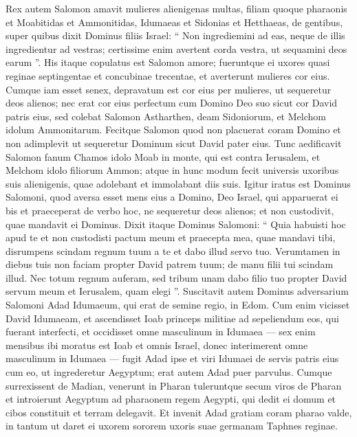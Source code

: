 \begin{biblechapter}
\begin{biblechapter}
\begin{biblechapter}
\begin{biblechapter}
\begin{biblechapter}
\begin{biblechapter}
\begin{biblechapter}
\begin{biblechapter}
\begin{biblechapter}
\begin{biblechapter}
\begin{biblechapter}
\verse Rex autem Salomon amavit mulieres alienigenas multas, filiam quoque pharaonis et Moabitidas et Ammonitidas, Idumaeas et Sidonias et Hetthaeas, 
\verse de gentibus, super quibus dixit Dominus filiis Israel: “ Non ingrediemini ad eas, neque de illis ingredientur ad vestras; certissime enim avertent corda vestra, ut sequamini deos earum ”. His itaque copulatus est Salomon amore; 
\verse fueruntque ei uxores quasi reginae septingentae et concubinae trecentae, et averterunt mulieres cor eius. 
\verse Cumque iam esset senex, depravatum est cor eius per mulieres, ut sequeretur deos alienos; nec erat cor eius perfectum cum Domino Deo suo sicut cor David patris eius, 
\verse sed colebat Salomon Astharthen, deam Sidoniorum, et Melchom idolum Ammonitarum. 
\verse Fecitque Salomon quod non placuerat coram Domino et non adimplevit ut sequeretur Dominum sicut David pater eius. 
\verse Tunc aedificavit Salomon fanum Chamos idolo Moab in monte, qui est contra Ierusalem, et Melchom idolo filiorum Ammon; 
\verse atque in hunc modum fecit universis uxoribus suis alienigenis, quae adolebant et immolabant diis suis.
 \verse Igitur iratus est Dominus Salomoni, quod aversa esset mens eius a Domino, Deo Israel, qui apparuerat ei bis 
\verse et praeceperat de verbo hoc, ne sequeretur deos alienos; et non custodivit, quae mandavit ei Dominus. 
\verse Dixit itaque Dominus Salomoni: “ Quia habuisti hoc apud te et non custodisti pactum meum et praecepta mea, quae mandavi tibi, disrumpens scindam regnum tuum a te et dabo illud servo tuo. 
\verse Verumtamen in diebus tuis non faciam propter David patrem tuum; de manu filii tui scindam illud. 
\verse Nec totum regnum auferam, sed tribum unam dabo filio tuo propter David servum meum et Ierusalem, quam elegi ”.
 \verse Suscitavit autem Dominus adversarium Salomoni Adad Idumaeum, qui erat de semine regio, in Edom. 
\verse Cum enim vicisset David Idumaeam, et ascendisset Ioab princeps militiae ad sepeliendum eos, qui fuerant interfecti, et occidisset omne masculinum in Idumaea 
\verse — sex enim mensibus ibi moratus est Ioab et omnis Israel, donec interimerent omne masculinum in Idumaea — 
\verse fugit Adad ipse et viri Idumaei de servis patris eius cum eo, ut ingrederetur Aegyptum; erat autem Adad puer parvulus. 
\verse Cumque surrexissent de Madian, venerunt in Pharan tuleruntque secum viros de Pharan et introierunt Aegyptum ad pharaonem regem Aegypti, qui dedit ei domum et cibos constituit et terram delegavit. 
 \verse Et invenit Adad gratiam coram pharao valde, in tantum ut daret ei uxorem sororem uxoris suae germanam Taphnes reginae. 

\end{biblechapter}
\end{biblechapter}
\end{biblechapter}
\end{biblechapter}
\end{biblechapter}
\end{biblechapter}
\end{biblechapter}
\end{biblechapter}
\end{biblechapter}
\end{biblechapter}
\end{biblechapter}
